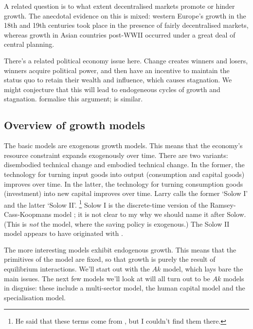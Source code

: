\documentclass[11pt,letterpaper,reqno,oneside]{article}
\begin{document}
A related question is to what extent decentralised markets promote or hinder growth. The anecdotal evidence on this is mixed: western Europe's growth in the 18th and 19th centuries took place in the presence of fairly decentralised markets, whereas growth in Asian countries post-WWII occurred under a great deal of central planning.

There's a related political economy issue here. Change creates winners and losers, winners acquire political power, and then have an incentive to maintain the status quo to retain their wealth and influence, which causes stagnation. We might conjecture that this will lead to endogeneous cycles of growth and stagnation. \textcite{KrusellRiosrull1996} formalise this argument; \textcite{ParentePrescott2000} is similar.



\subsection{Overview of growth models}
\label{sec:26Oct2015:overview_of_models}

The basic models are exogenous growth models. This means that the economy's resource constraint expands exogenously over time. There are two variants: disembodied technical change and embodied technical change. In the former, the technology for turning input goods into output (consumption and capital goods) improves over time. In the latter, the technology for turning consumption goods (investment) into new capital improves over time. Larry calls the former `Solow I' and the latter `Solow II'.%
	\footnote{He said that these terms come from \textcite{GreenwoodHercowitzKrusell1997}, but I couldn't find them there.}
Solow I is the discrete-time version of the Ramsey-Cass-Koopmans model \parencite{Ramsey1928,Cass1965,Koopmans1965}; it is not clear to my why we should name it after Solow. (This is \emph{not} the \textcite{Solow1956} model, where the saving policy is exogenous.) The Solow II model appears to have originated with \textcite{Solow1960}.

The more interesting models exhibit endogenous growth. This means that the primitives of the model are fixed, so that growth is purely the result of equilibrium interactions. We'll start out with the $Ak$ model, which lays bare the main issues. The next few models we'll look at will all turn out to be $Ak$ models in disguise: these include a multi-sector model, the human capital model and the \textcite{Romer1987} specialisation model.
\end{document}
